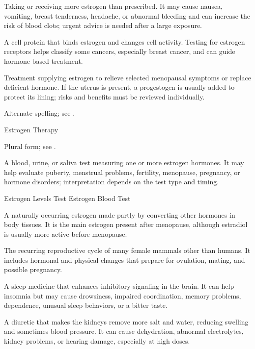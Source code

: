  Taking or receiving more estrogen than prescribed. It may cause nausea, vomiting, breast tenderness, headache, or abnormal bleeding and can increase the risk of blood clots; urgent advice is needed after a large exposure.

 A cell protein that binds estrogen and changes cell activity. Testing for estrogen receptors helps classify some cancers, especially breast cancer, and can guide hormone-based treatment.

 Treatment supplying estrogen to relieve selected menopausal symptoms or replace deficient hormone. If the uterus is present, a progestogen is usually added to protect its lining; risks and benefits must be reviewed individually.

 Alternate spelling; see .

\synonyms
Estrogen Therapy

 Plural form; see .

 A blood, urine, or saliva test measuring one or more estrogen hormones. It may help evaluate puberty, menstrual problems, fertility, menopause, pregnancy, or hormone disorders; interpretation depends on the test type and timing.

\synonyms
Estrogen Levels Test
Estrogen Blood Test

 A naturally occurring estrogen made partly by converting other hormones in body tissues. It is the main estrogen present after menopause, although estradiol is usually more active before menopause.

 The recurring reproductive cycle of many female mammals other than humans. It includes hormonal and physical changes that prepare for ovulation, mating, and possible pregnancy.

 A sleep medicine that enhances inhibitory signaling in the brain. It can help insomnia but may cause drowsiness, impaired coordination, memory problems, dependence, unusual sleep behaviors, or a bitter taste.

 A diuretic that makes the kidneys remove more salt and water, reducing swelling and sometimes blood pressure. It can cause dehydration, abnormal electrolytes, kidney problems, or hearing damage, especially at high doses.

